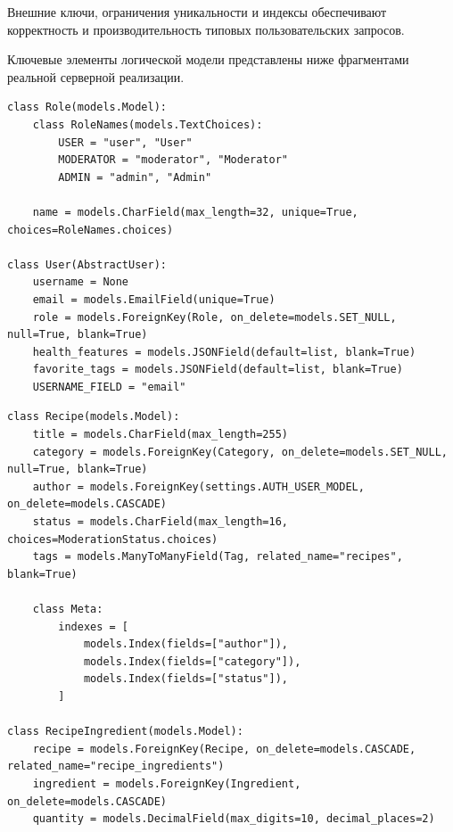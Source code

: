 Внешние ключи, ограничения уникальности и индексы обеспечивают корректность и производительность типовых пользовательских запросов.

Ключевые элементы логической модели представлены ниже фрагментами реальной серверной реализации.

\begin{listing}[H]
\caption{Модель ролей и пользователей}
\label{listing:user-role-model}
\begin{mdframed}
\begin{verbatim}
class Role(models.Model):
    class RoleNames(models.TextChoices):
        USER = "user", "User"
        MODERATOR = "moderator", "Moderator"
        ADMIN = "admin", "Admin"

    name = models.CharField(max_length=32, unique=True, choices=RoleNames.choices)

class User(AbstractUser):
    username = None
    email = models.EmailField(unique=True)
    role = models.ForeignKey(Role, on_delete=models.SET_NULL, null=True, blank=True)
    health_features = models.JSONField(default=list, blank=True)
    favorite_tags = models.JSONField(default=list, blank=True)
    USERNAME_FIELD = "email"
\end{verbatim}
\end{mdframed}
\end{listing}

\begin{listing}[H]
\caption{Фрагмент модели рецептов и состава ингредиентов}
\label{listing:recipe-model}
\begin{mdframed}
\begin{verbatim}
class Recipe(models.Model):
    title = models.CharField(max_length=255)
    category = models.ForeignKey(Category, on_delete=models.SET_NULL, null=True, blank=True)
    author = models.ForeignKey(settings.AUTH_USER_MODEL, on_delete=models.CASCADE)
    status = models.CharField(max_length=16, choices=ModerationStatus.choices)
    tags = models.ManyToManyField(Tag, related_name="recipes", blank=True)

    class Meta:
        indexes = [
            models.Index(fields=["author"]),
            models.Index(fields=["category"]),
            models.Index(fields=["status"]),
        ]

class RecipeIngredient(models.Model):
    recipe = models.ForeignKey(Recipe, on_delete=models.CASCADE, related_name="recipe_ingredients")
    ingredient = models.ForeignKey(Ingredient, on_delete=models.CASCADE)
    quantity = models.DecimalField(max_digits=10, decimal_places=2)
\end{verbatim}
\end{mdframed}
\end{listing}

